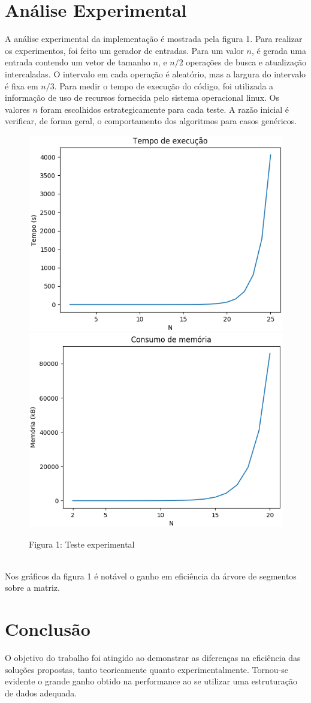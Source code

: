 \documentclass{article}
\begin{document}
\pagebreak


\section{Análise Experimental}
A análise experimental da implementação é mostrada pela figura 1. Para realizar os experimentos, foi feito um gerador de entradas. Para um valor $n$, é gerada uma entrada contendo um vetor de tamanho $n$, e $n / 2$ operações de busca e atualização intercaladas. O intervalo em cada operação é aleatório, mas a largura do intervalo é fixa em $n / 3$. Para medir o tempo de execução do código, foi utilizada a informação de uso de recursos fornecida pelo sistema operacional linux. Os valores $n$ foram escolhidos estrategicamente para cada teste. A razão inicial é verificar, de forma geral, o comportamento dos algoritmos para casos genéricos.
\vspace{-10pt}
\begin{figure}[h]
  \centering
  \includegraphics[width=0.49\linewidth]{images/time.png}
  \includegraphics[width=0.49\linewidth]{images/space.png}
  \caption{Figura 1: Teste experimental}
\end{figure}\\
Nos gráficos da figura 1 é notável o ganho em eficiência da árvore de segmentos sobre a matriz.


\section{Conclusão}
O objetivo do trabalho foi atingido ao demonstrar as diferenças na eficiência das soluções propostas, tanto teoricamente quanto experimentalmente. Tornou-se evidente o grande ganho obtido na performance ao se utilizar uma estruturação de dados adequada.
\end{document}

